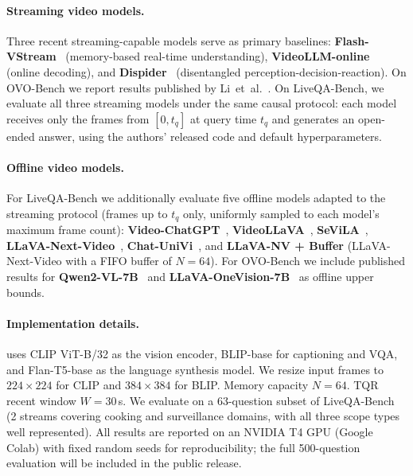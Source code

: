 \paragraph{Streaming video models.}
Three recent streaming-capable models serve as primary baselines:
\textbf{Flash-VStream}~\cite{zhang2024flashvstream} (memory-based real-time understanding),
\textbf{VideoLLM-online}~\cite{chen2024videollmonline} (online decoding), and
\textbf{Dispider}~\cite{he2024dispider} (disentangled perception-decision-reaction).
On OVO-Bench we report results published by Li~et~al.~\cite{li2025ovobench}.
On LiveQA-Bench, we evaluate all three streaming models under the same causal protocol: each model receives only the frames from $[0, t_q]$ at query time $t_q$ and generates an open-ended answer, using the authors' released code and default hyperparameters.

\paragraph{Offline video models.}
For LiveQA-Bench we additionally evaluate five offline models adapted to the streaming protocol (frames up to $t_q$ only, uniformly sampled to each model's maximum frame count):
\textbf{Video-ChatGPT}~\cite{maaz2023videochatgpt},
\textbf{VideoLLaVA}~\cite{lin2023videollava},
\textbf{SeViLA}~\cite{yu2023sevila},
\textbf{LLaVA-Next-Video}~\cite{zhang2024llavanextvideo},
\textbf{Chat-UniVi}~\cite{jin2024chatunivi},
and \textbf{LLaVA-NV + Buffer} (LLaVA-Next-Video with a FIFO buffer of $N\!=\!64$).
For OVO-Bench we include published results for \textbf{Qwen2-VL-7B}~\cite{wang2024qwen2vl} and \textbf{LLaVA-OneVision-7B}~\cite{li2024llavaonevision} as offline upper bounds.

\paragraph{Implementation details.}
\ours uses CLIP ViT-B/32 as the vision encoder, BLIP-base for captioning and VQA, and Flan-T5-base as the language synthesis model.
We resize input frames to $224\times224$ for CLIP and $384\times384$ for BLIP. Memory capacity $N\!=\!64$. TQR recent window $W\!=\!30$\,s.
We evaluate on a 63-question subset of LiveQA-Bench (2 streams covering cooking and surveillance domains, with all three scope types well represented). All \ours results are reported on an NVIDIA T4 GPU (Google Colab) with fixed random seeds for reproducibility; the full 500-question evaluation will be included in the public release.


